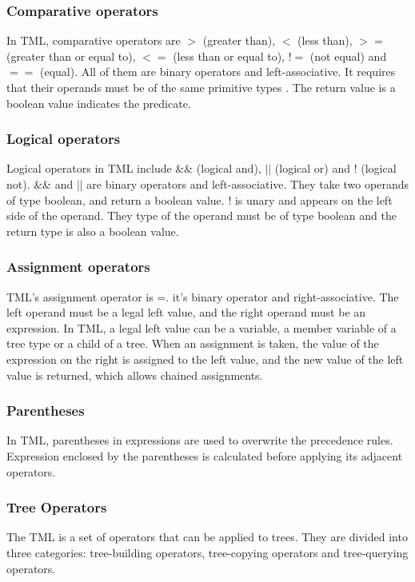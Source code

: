 \documentclass[12pt,psfig,a4]{article}
\begin{document}
\subsubsection{Comparative operators}
In TML, comparative operators are $>$ (greater than), $<$ (less than), $>=$ (greater than or equal to), $<=$ (less than or equal to), $!=$ (not equal) and $==$ (equal). All of them are binary operators and left-associative. It requires that their operands must be of the same primitive types . The return value is a boolean value indicates the predicate.

\subsubsection{Logical operators}
Logical operators in TML include $\&\&$ (logical and), $||$ (logical or) and ! (logical not). \&\& and $||$ are binary operators and left-associative. They take two operands of type boolean, and return a boolean value. ! is unary and appears on the left side of the operand. They type of the operand must be of type boolean and the return type is also a boolean value.

\subsubsection{Assignment operators}
TML's assignment operator is =. it's binary operator and right-associative. The left operand must be a legal left value, and the right operand must be an expression. In TML, a legal left value can be a variable, a member variable of a tree type or a child of a tree. When an assignment is taken, the value of the expression on the right is assigned to the left value, and the new value of the left value is returned, which allows chained assignments. 

\subsubsection{Parentheses}
In TML, parentheses in expressions are used to overwrite the precedence rules. Expression enclosed by the parentheses is calculated before applying its adjacent operators.

\subsubsection{Tree Operators}
The TML is a set of operators that can be applied to trees. They are divided into three categories: tree-building operators, tree-copying operators and tree-querying operators.
\end{document}
